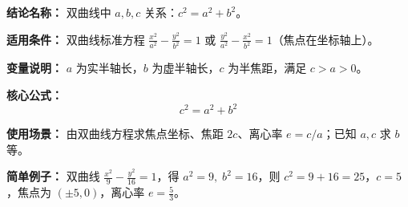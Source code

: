 \textbf{结论名称：} 双曲线中 \(a,b,c\) 关系：\(c^2=a^2+b^2\)。

\textbf{适用条件：} 双曲线标准方程 \(\frac{x^2}{a^2}-\frac{y^2}{b^2}=1\) 或 \(\frac{y^2}{a^2}-\frac{x^2}{b^2}=1\)（焦点在坐标轴上）。

\textbf{变量说明：} \(a\) 为实半轴长，\(b\) 为虚半轴长，\(c\) 为半焦距，满足 \(c>a>0\)。

\textbf{核心公式：} \[ \boxed{c^2 = a^2 + b^2} \]

\textbf{使用场景：} 由双曲线方程求焦点坐标、焦距 \(2c\)、离心率 \(e=c/a\)；已知 \(a,c\) 求 \(b\) 等。

\textbf{简单例子：} 双曲线 \(\frac{x^2}{9}-\frac{y^2}{16}=1\)，得 \(a^2=9,\;b^2=16\)，则 \(c^2=9+16=25\)，\(c=5\)，焦点为 \((\pm5,0)\)，离心率 \(e=\frac{5}{3}\)。